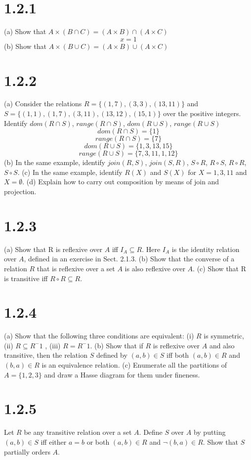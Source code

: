 \documentclass{article}
\begin{document}
\section*{1.2.1}
(a) Show that $A \times  (B \cap C) = (A \times B) \cap (A \times C)$
\begin{equation*}
    x = 1
\end{equation*}
(b) Show that $A \times (B \cup C) = (A \times B) \cup (A \times C)$

\section*{1.2.2}
(a) Consider the relations $R=\{ (1,7), (3,3), (13,11) \}$ and $S=\{ (1,1), (1,7), (3,11), (13,12), (15,1) \}$ over the positive integers. Identify $dom(R\cap S)$, $range(R\cap S)$, $dom(R\cup S)$, $range(R\cup S)$
\begin{equation*}
    dom(R\cap S) = \{ 1\}
\end{equation*}
\begin{equation*}
    range(R\cap S) = \{ 7\}
\end{equation*}
\begin{equation*}
    dom(R\cup S) = \{ 1, 3, 13, 15 \}
\end{equation*}
\begin{equation*}
    range(R\cup S) = \{ 7, 3, 11, 1, 12 \}
\end{equation*}
(b) In the same example, identify $join(R,S)$, $join(S,R)$, $S \circ R$, $R\circ S$, $R \circ R$, $S \circ S$.
(c) In the same example, identify $R(X)$ and $S(X)$ for $X={1,3,11}$ and $X=\emptyset$.
(d) Explain how to carry out composition by means of join and projection.
\section*{1.2.3}
(a) Show that R is reflexive over $A$ iff $I_A \subseteq R$. Here $I_A$ is the identity relation over $A$, defined in an exercise in Sect. 2.1.3.
(b) Show that the converse of a relation $R$ that is reflexive over a set $A$ is also reflexive over $A$.
(c) Show that R is transitive iff $R \circ R \subseteq R$.
\section*{1.2.4}
(a) Show that the following three conditions are equivalent: (i) $R$ is symmetric, (ii) $R \subseteq R^-1$ , (iii) $R = R^-1$.
(b) Show that if $R$ is reflexive over $A$ and also transitive, then the relation $S$ defined by $(a,b) \in S$ iff both $(a,b) \in R$ and $(b,a) \in R$ is an equivalence relation.
(c) Enumerate all the partitions of $A=\{ 1, 2, 3 \}$ and draw a Hasse diagram for them under fineness.
\section*{1.2.5}
Let $R$ be any transitive relation over a set $A$. Define $S$ over $A$ by putting $(a,b) \in S$ iff either $a = b$ or both $(a,b) \in R$ and $\neg (b,a) \in R$. Show that $S$ partially orders $A$.
\end{document}
